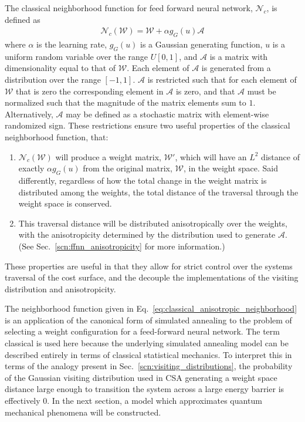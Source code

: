 \documentclass[11pt]{afthesis}
\begin{document}
	The classical neighborhood function for feed forward neural network, \begin{math}\mathcal{N}_{c}\end{math}, is defined as \begin{align}\label{eq:classical_anisotropic_neighborhood}
	\mathcal{N}_{c} (\boldsymbol{\mathcal{W}}) = \boldsymbol{\mathcal{W}} + \alpha g_{G}(u) \boldsymbol{\mathcal{A}} 
	\end{align}
	\noindent where $\alpha$ is the learning rate, $g_{G}(u)$ is a Gaussian generating function, $u$ is a uniform random variable over the range $U[0,1]$, and $\boldsymbol{\mathcal{A}}$ is a matrix with dimensionality equal to that of $\boldsymbol{\mathcal{W}}$. Each element of $\boldsymbol{\mathcal{A}}$ is generated from a distribution over the range $[-1,1]$. $\boldsymbol{\mathcal{A}}$ is restricted such that for each element of $\boldsymbol{\mathcal{W}}$ that is zero the corresponding element in $\boldsymbol{\mathcal{A}}$ is zero, and that $\boldsymbol{\mathcal{A}}$ must be normalized such that the magnitude of the matrix elements sum to $1$. Alternatively, $\boldsymbol{\mathcal{A}}$ may be defined as a stochastic matrix with element-wise randomized sign. These restrictions ensure two useful properties of the classical neighborhood function, that: 
	
	\begin{enumerate}
		\item $\mathcal{N}_{c} (\boldsymbol{\mathcal{W}})$ will produce a weight matrix, $\boldsymbol{\mathcal{W}'}$, which will have an $L^2$ distance of exactly $\alpha g_{G}(u)$ from the original matrix, $\boldsymbol{\mathcal{W}}$, in the weight space. Said differently, regardless of how the total change in the weight matrix is distributed among the weights, the total distance of the traversal through the weight space is conserved.
		\item This traversal distance will be distributed anisotropically over the weights, with the anisotropicity determined by the distribution used to generate $\boldsymbol{\mathcal{A}}$. (See Sec.~\ref{scn:ffnn_anisotropicity} for more information.)
	\end{enumerate}
	These properties are useful in that they allow for strict control over the systems traversal of the cost surface, and the decouple the implementations of the visiting distribution and anisotropicity.
	
	The neighborhood function given in Eq.~\ref{eq:classical_anisotropic_neighborhood} is an application of the canonical form of simulated annealing to the problem of selecting a weight configuration for a feed-forward neural network. The term classical is used here because the underlying simulated annealing model can be described entirely in terms of classical statistical mechanics. To interpret this in terms of the analogy present in Sec.~\ref{scn:visiting_distributions}, the probability of the Gaussian visiting distribution used in CSA generating a weight space distance large enough to transition the system across a large energy barrier is effectively $0$. In the next section, a model which approximates quantum mechanical phenomena will be constructed.
	
\end{document}
